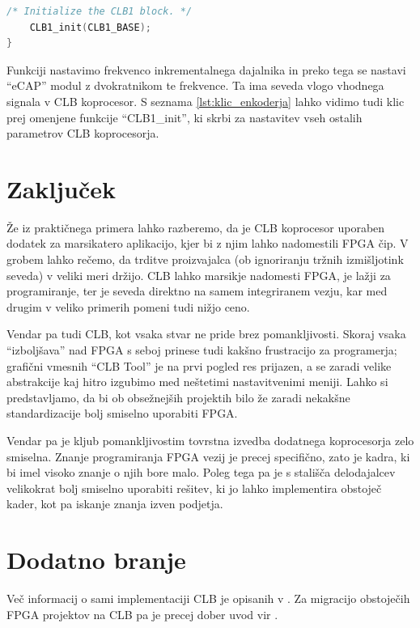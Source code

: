 \documentclass[a4paper]{article}
\begin{document}
\begin{sloppypar}
\begin{lstlisting}[language=C,
                   caption={Implementacija funkcije za nastavitev 
                            inkrementalnega dajalnika},
                   label={lst:klic_enkoderja}]
    /* Initialize the CLB1 block. */
    CLB1_init(CLB1_BASE);
}
\end{lstlisting}

Funkciji nastavimo frekvenco inkrementalnega dajalnika in preko tega se nastavi
``eCAP'' modul z dvokratnikom te frekvence. Ta ima seveda vlogo vhodnega
signala v CLB koprocesor. S seznama \ref{lst:klic_enkoderja} lahko vidimo tudi
klic prej omenjene funkcije ``CLB1\_init'', ki skrbi za nastavitev vseh ostalih
parametrov CLB koprocesorja.



\section{Zaključek}
Že iz praktičnega primera lahko razberemo, da je CLB koprocesor uporaben
dodatek za marsikatero aplikacijo, kjer bi z njim lahko nadomestili FPGA čip. V
grobem lahko rečemo, da trditve proizvajalca (ob ignoriranju tržnih
izmišljotink seveda) v veliki meri držijo. CLB lahko marsikje nadomesti FPGA,
je lažji za programiranje, ter je seveda direktno na samem integriranem vezju,
kar med drugim v veliko primerih pomeni tudi nižjo ceno.

Vendar pa tudi CLB, kot vsaka stvar ne pride brez pomankljivosti. Skoraj vsaka
``izboljšava'' nad FPGA s seboj prinese tudi kakšno frustracijo za programerja;
grafični vmesnih ``CLB Tool'' je na prvi pogled res prijazen, a se zaradi
velike abstrakcije kaj hitro izgubimo med neštetimi nastavitvenimi meniji.
Lahko si predstavljamo, da bi ob obsežnejših projektih bilo že zaradi nekakšne
standardizacije bolj smiselno uporabiti FPGA.

Vendar pa je kljub pomankljivostim tovrstna izvedba dodatnega koprocesorja zelo
smiselna. Znanje programiranja FPGA vezij je precej specifično, zato je kadra,
ki bi imel visoko znanje o njih bore malo. Poleg tega pa je s stališča
delodajalcev velikokrat bolj smiselno uporabiti rešitev, ki jo lahko
implementira obstoječ kader, kot pa iskanje znanja izven podjetja.



\section{Dodatno branje}
Več informacij o sami implementaciji CLB je opisanih v \cite{clb-designing}. Za
migracijo obstoječih FPGA projektov na CLB pa je precej dober uvod vir
\cite{fpga-to-clb}.



\printbibliography



\end{sloppypar}
\end{document}
